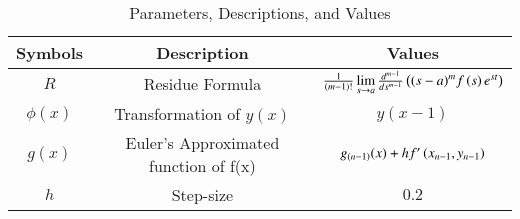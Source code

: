 \begin{table}[ht!]
\centering
\begin{tabular}{ |c|c|c| } 
 \hline
Symbols & Description & Values  \\
\hline
$R$ & Residue Formula &$\frac{1}{\left(m-1\right)!}\lim\limits_{s\to a}\frac{d^{m-1}}{ds^{m-1}}\left({(s-a)}^{m}f\left(s\right)e^{st}\right)$\\
 \hline
 $\phi(x)$ & Transformation of $y(x)$ & $y(x-1)$\\
 \hline
$g(x)$ & Euler's Approximated function of f(x) & $g_{(n-1)}(x) + hf'\left(x_{n-1},y_{n-1}\right)$\\
 \hline
 $h$ & Step-size & $0.2$\\
 \hline
\end{tabular}
\caption{Parameters, Descriptions, and Values}
\label{table:ee25-ce48-gate2022}
\end{table}



